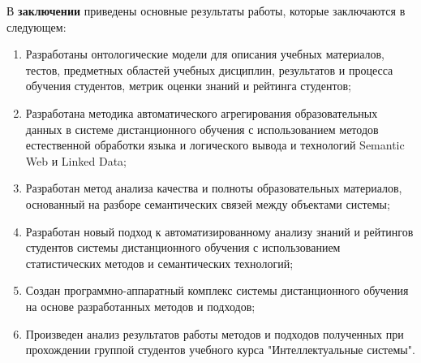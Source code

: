 В \textbf{заключении} приведены основные результаты работы, которые заключаются в следующем:
\begin{enumerate}
 \item Разработаны онтологические модели для описания учебных материалов, тестов, предметных областей учебных дисциплин, результатов и процесса обучения студентов, метрик оценки знаний и рейтинга студентов;
 \item Разработана методика автоматического агрегирования образовательных данных в системе дистанционного обучения с использованием методов естественной обработки языка и логического вывода и технологий Semantic Web и Linked Data;
 \item Разработан метод анализа качества и полноты образовательных материалов, основанный на разборе семантических связей между объектами системы;
  \item Разработан новый подход к автоматизированному анализу знаний и рейтингов студентов системы дистанционного обучения с использованием статистических методов и семантических технологий;
  \item Создан программно-аппаратный комплекс системы дистанционного обучения на основе разработанных методов и подходов;
  \item Произведен анализ результатов работы методов и подходов полученных при прохождении группой студентов учебного курса "Интеллектуальные системы".
  \end{enumerate}


\renewcommand{\refname}{\Large Публикации автора по теме диссертации}
\nocite{*}
